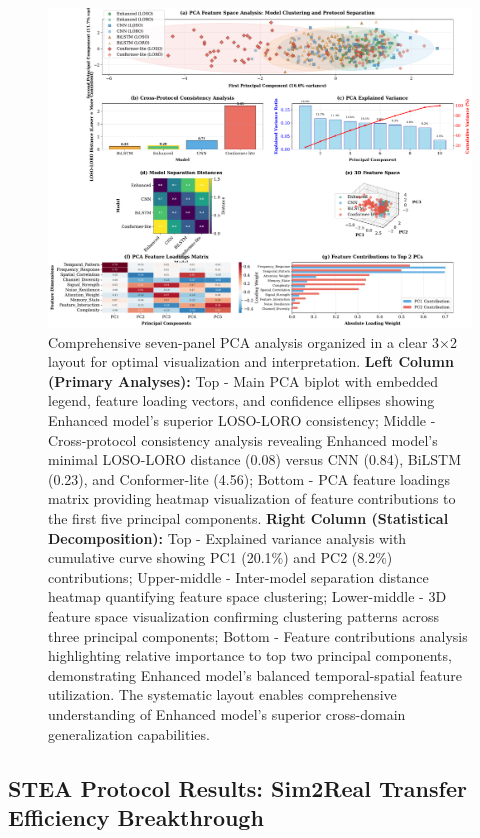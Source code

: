 \documentclass[journal]{IEEEtran}
\begin{document}
\begin{figure}[ht]
\centering
\includegraphics[width=\columnwidth]{figures/fig6_pca_analysis.pdf}
\caption{Comprehensive seven-panel PCA analysis organized in a clear 3×2 layout for optimal visualization and interpretation. \textbf{Left Column (Primary Analyses):} Top - Main PCA biplot with embedded legend, feature loading vectors, and confidence ellipses showing Enhanced model's superior LOSO-LORO consistency; Middle - Cross-protocol consistency analysis revealing Enhanced model's minimal LOSO-LORO distance (0.08) versus CNN (0.84), BiLSTM (0.23), and Conformer-lite (4.56); Bottom - PCA feature loadings matrix providing heatmap visualization of feature contributions to the first five principal components. \textbf{Right Column (Statistical Decomposition):} Top - Explained variance analysis with cumulative curve showing PC1 (20.1\%) and PC2 (8.2\%) contributions; Upper-middle - Inter-model separation distance heatmap quantifying feature space clustering; Lower-middle - 3D feature space visualization confirming clustering patterns across three principal components; Bottom - Feature contributions analysis highlighting relative importance to top two principal components, demonstrating Enhanced model's balanced temporal-spatial feature utilization. The systematic layout enables comprehensive understanding of Enhanced model's superior cross-domain generalization capabilities.}
\label{fig:pca_analysis}
\end{figure}

\subsection{STEA Protocol Results: Sim2Real Transfer Efficiency Breakthrough}
\end{document}
